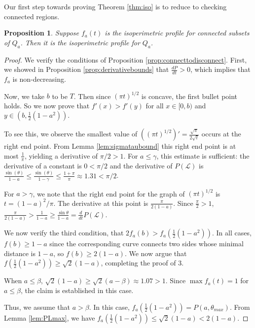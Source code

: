 \documentclass[leqno]{article}
\numberwithin{equation}{section}
\theoremstyle{definition}
\theoremstyle{remark}
\theoremstyle{plain}
\newtheorem{proposition}[equation]{Proposition}
\begin{document}
\iffalse

Our first step towards proving Theorem \ref{thm:iso} is to reduce to checking connected regions.

\begin{proposition}Suppose $f_a(t)$ is the isoperimetric profile for connected subsets of $Q_a$. Then it is the isoperimetric profile for $Q_a$.

\end{proposition}

\begin{proof}We verify the conditions of Proposition \ref{prop:connecttodisconnect}.  First, we showed in Proposition \ref{prop:derivativebounds} that $\frac{dP}{dt} > 0$, which implies that $f_a$ is non-decreasing.

Now, we take $b$ to be $T$.  Then since $(\pi t)^{1/2}$ is concave, the first bullet point holds.  So we now prove that $f'(x) > f'(y)$ for all $x\in [0,b)$ and $y\in \left(b,\frac{1}{2}(1-a^2)\right)$.

 To see this, we observe the smallest value of $((\pi t)^{1/2})' = \frac{\sqrt{\pi}}{2\sqrt{t}}$ occurs at the right end point.  From Lemma \ref{lem:sigmataubound} this right end point is at most $\frac{1}{\pi}$, yielding a derivative of $\pi/2 > 1$.  For $a\leq \gamma$, this estimate is sufficient: the derivative of a constant is $0 < \pi/2$ and the derivative of $P(\mathcal{L})$ is $\frac{\sin(\theta)}{1-a}\leq \frac{\sin(\theta)}{1-\gamma}\leq \frac{1+\pi}{\pi}\approx 1.31 < \pi/2$.

 For $a> \gamma$, we note that the right end point for the graph of $(\pi t)^{1/2}$ is $t = (1-a)^2/\pi$.  The derivative at this point is $\frac{\pi}{2(1-a)}$.  Since $\frac{\pi}{2} > 1$, $\frac{\pi}{2(1-a)} > \frac{1}{1-a} \geq \frac{\sin\theta}{1-a} = \frac{d}{dt}P(\mathcal{L})$.

\bigskip

We now verify the third condition, that $2f_a(b) > f_a\left(\frac{1}{2}(1-a^2)\right)$.   In all cases, $f(b) \geq 1-a$ since the corresponding curve connects two sides whose minimal distance is $1-a$, so $f(b) \geq 2(1-a)$.  We now argue that $f\left( \frac{1}{2}(1-a^2)\right) \geq \sqrt{2}(1-a)$, completing the proof of $3$.

 When $a\leq \beta$, $\sqrt{2}(1-a)\geq \sqrt{2}(a-\beta) \approx 1.07 > 1$.  Since $\max f_a(t) =1$ for $a\leq \beta$, the claim is established in this case.

Thus, we assume that $a > \beta$.  In this case, $f_a\left( \frac{1}{2}(1-a^2)\right) = P(a,\theta_{max})$.  From Lemma \ref{lem:PLmax}, we have $f_a\left( \frac{1}{2}(1-a^2)\right)\leq \sqrt{2}(1-a) < 2(1-a)$.


\end{proof}
\end{document}
